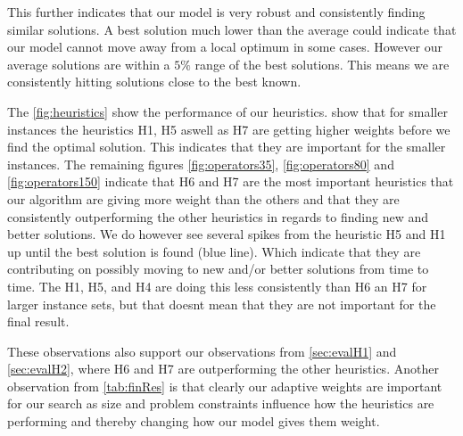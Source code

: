 \documentclass[../main.tex]{subfiles}
\begin{document}
This further indicates that our model is very robust and consistently finding similar solutions.
A best solution much lower than the average could indicate that our model cannot move away from a local optimum in some cases.
However our average solutions are within a $5\%$ range of the best solutions.
This means we are consistently hitting solutions close to the best known.
\par
The \cref{fig:heuristics} show the performance of our heuristics.
 show that for smaller instances the heuristics H1, H5 aswell as H7 are getting higher weights before we find the optimal solution. This indicates that they are important for the smaller instances.
The remaining figures \ref{fig:operators35}, \ref{fig:operators80} and \ref{fig:operators150} indicate that H6 and H7 are the most important heuristics that our algorithm are giving more weight than the others and that they are consistently outperforming the other heuristics in regards to finding new and better solutions. 
We do however see several spikes from the heuristic H5 and H1 up until the best solution is found (blue line). 
Which indicate that they are contributing on possibly moving to new and/or better solutions from time to time. 
The H1, H5, and H4 are doing this less consistently than H6 an H7 for larger instance sets, but that doesnt mean that they are not important for the final result. \par
These observations also support our observations from \cref{sec:evalH1} and \cref{sec:evalH2}, where H6 and H7 are outperforming the other heuristics. 
Another observation from \cref{tab:finRes} is that clearly our adaptive weights are important for our search as size and problem constraints influence how the heuristics are performing and thereby changing how our model gives them weight. 

\biblio                                                         
\end{document}
